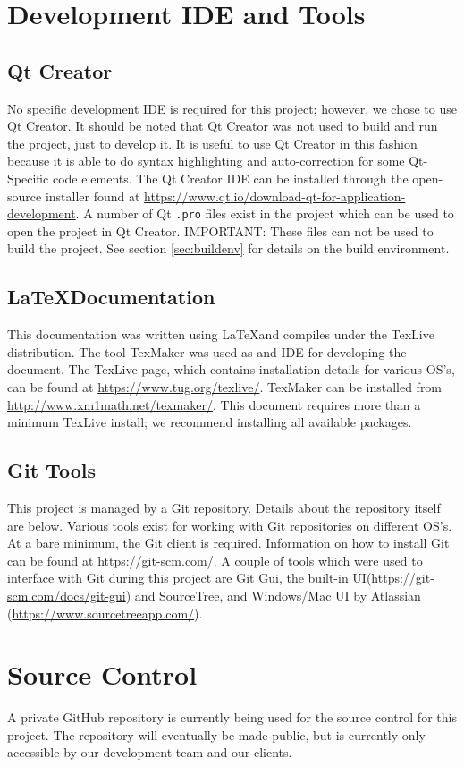 \section{Development IDE and Tools}
\subsection{Qt Creator}
No specific development IDE is required for this project; however, we chose to use Qt Creator. It should be noted that Qt Creator was not used to build and run the project, just to develop it. It is useful to use Qt Creator in this fashion because it is able to do syntax highlighting and auto-correction for some Qt-Specific code elements. The Qt Creator IDE can be installed through the open-source installer found at \url{https://www.qt.io/download-qt-for-application-development}. A number of Qt \lstinline|.pro| files exist in the project which can be used to open the project in Qt Creator. IMPORTANT: These files can not be used to build the project. See section \ref{sec:buildenv} for details on the build environment.

\subsection{\LaTeX Documentation}
This documentation was written using \LaTeX and compiles under the TexLive distribution. The tool TexMaker was used as and IDE for developing the document.
The TexLive page, which contains installation details for various OS's, can be found at \url{https://www.tug.org/texlive/}. TexMaker can be installed from \url{http://www.xm1math.net/texmaker/}. This document requires more than a minimum TexLive install; we recommend installing all available packages.

\subsection{Git Tools}
This project is managed by a Git repository. Details about the repository itself are below. Various tools exist for working with Git repositories on different OS's. At a bare minimum, the Git client is required. Information on how to install Git can be found at \url{https://git-scm.com/}. A couple of tools which were used to interface with Git during this project are Git Gui, the built-in UI(\url{https://git-scm.com/docs/git-gui}) and SourceTree, and Windows/Mac UI by Atlassian (\url{https://www.sourcetreeapp.com/}).
\section{Source  Control}
A private GitHub repository is currently being used for the source control for this project. The repository will eventually be made public, but is currently only accessible by our development team and our clients.

